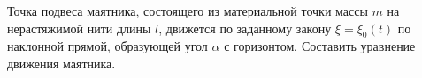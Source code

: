 Точка подвеса маятника, состоящего из материальной точки массы $m$ на
нерастяжимой нити длины $l$, движется по заданному закону $\xi = \xi _0(t)$
по наклонной прямой, образующей угол $\alpha$ с горизонтом.
Составить уравнение движения маятника.

